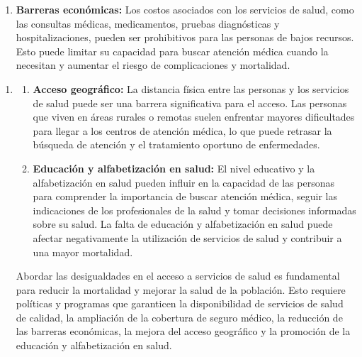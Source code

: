 \documentclass[8pt,a4paper]{beamer}
\begin{document}
{\begin{frame}{}
\begin{block}{}
\begin{enumerate}
\begin{enumerate}
\item[\ding{99}] \textbf{Barreras económicas:} Los costos asociados con los servicios de salud, como las consultas médicas, medicamentos, pruebas diagnósticas y hospitalizaciones, pueden ser prohibitivos para las personas de bajos recursos. Esto puede limitar su capacidad para buscar atención médica cuando la necesitan y aumentar el riesgo de complicaciones y mortalidad.
\end{enumerate}
\end{enumerate}
\end{block}
\end{frame}

\begin{frame}{}
\setlength{\parskip}{3px}
\justifying
\begin{block}{}
\setlength{\parskip}{3px}
\justifying
\begin{enumerate}
\setlength{\parskip}{3px}
\justifying
\item[{}] 
\begin{enumerate}
\setlength{\parskip}{3px}
\justifying
\item[\ding{99}] \textbf{Acceso geográfico:} La distancia física entre las personas y los servicios de salud puede ser una barrera significativa para el acceso. Las personas que viven en áreas rurales o remotas suelen enfrentar mayores dificultades para llegar a los centros de atención médica, lo que puede retrasar la búsqueda de atención y el tratamiento oportuno de enfermedades.

\item[\ding{99}] \textbf{Educación y alfabetización en salud:} El nivel educativo y la alfabetización en salud pueden influir en la capacidad de las personas para comprender la importancia de buscar atención médica, seguir las indicaciones de los profesionales de la salud y tomar decisiones informadas sobre su salud. La falta de educación y alfabetización en salud puede afectar negativamente la utilización de servicios de salud y contribuir a una mayor mortalidad.
\end{enumerate}
Abordar las desigualdades en el acceso a servicios de salud es fundamental para reducir la mortalidad y mejorar la salud de la población. Esto requiere políticas y programas que garanticen la disponibilidad de servicios de salud de calidad, la ampliación de la cobertura de seguro médico, la reducción de las barreras económicas, la mejora del acceso geográfico y la promoción de la educación y alfabetización en salud.
\end{enumerate}
\end{block}
\end{frame}

}
\end{document}
